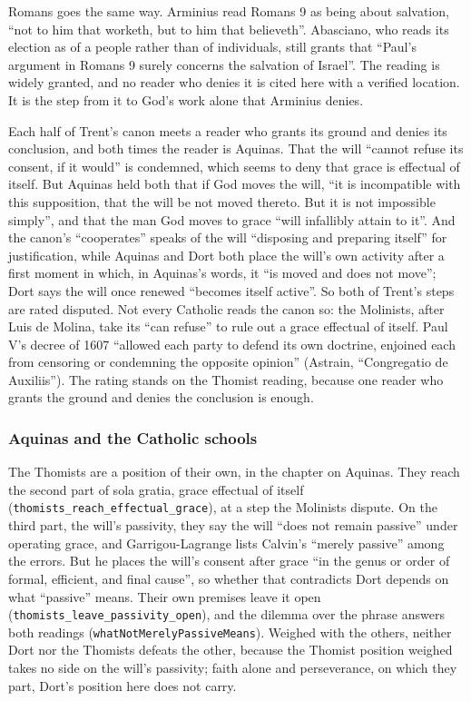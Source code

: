 \documentclass[11pt]{article}
\begin{document}
Romans goes the same way. Arminius read Romans 9 as being about salvation, “not to him that worketh, but to him that believeth”. Abasciano, who reads its election as of a people rather than of individuals, still grants that “Paul’s argument in Romans 9 surely concerns the salvation of Israel”. The reading is widely granted, and no reader who denies it is cited here with a verified location. It is the step from it to God’s work alone that Arminius denies.

Each half of Trent’s canon meets a reader who grants its ground and denies its conclusion, and both times the reader is Aquinas. That the will “cannot refuse its consent, if it would” is condemned, which seems to deny that grace is effectual of itself. But Aquinas held both that if God moves the will, “it is incompatible with this supposition, that the will be not moved thereto. But it is not impossible simply”, and that the man God moves to grace “will infallibly attain to it”. And the canon’s “cooperates” speaks of the will “disposing and preparing itself” for justification, while Aquinas and Dort both place the will’s own activity after a first moment in which, in Aquinas’s words, it “is moved and does not move”; Dort says the will once renewed “becomes itself active”. So both of Trent’s steps are rated disputed. Not every Catholic reads the canon so: the Molinists, after Luis de Molina, take its “can refuse” to rule out a grace effectual of itself. Paul V’s decree of 1607 “allowed each party to defend its own doctrine, enjoined each from censoring or condemning the opposite opinion” (Astrain, “Congregatio de Auxiliis”). The rating stands on the Thomist reading, because one reader who grants the ground and denies the conclusion is enough.

\subsubsection*{Aquinas and the Catholic schools}
The Thomists are a position of their own, in the chapter on Aquinas. They reach the second part of sola gratia, grace effectual of itself (\texttt{thomists\_\allowbreak{}reach\_\allowbreak{}effectual\_\allowbreak{}grace}), at a step the Molinists dispute. On the third part, the will’s passivity, they say the will “does not remain passive” under operating grace, and Garrigou-Lagrange lists Calvin’s “merely passive” among the errors. But he places the will’s consent after grace “in the genus or order of formal, efficient, and final cause”, so whether that contradicts Dort depends on what “passive” means. Their own premises leave it open (\texttt{thomists\_\allowbreak{}leave\_\allowbreak{}passivity\_\allowbreak{}open}), and the dilemma over the phrase answers both readings (\texttt{what\allowbreak{}Not\allowbreak{}Merely\allowbreak{}Passive\allowbreak{}Means}). Weighed with the others, neither Dort nor the Thomists defeats the other, because the Thomist position weighed takes no side on the will’s passivity; faith alone and perseverance, on which they part, Dort’s position here does not carry.
\end{document}
